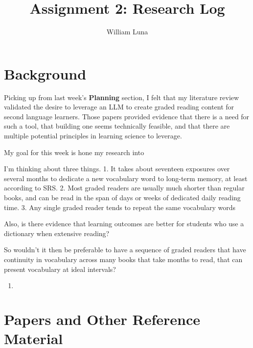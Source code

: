 \documentclass[
	letterpaper, %
]{jdf}
\author{William Luna}
\title{Assignment 2: Research Log}
\begin{document}

\maketitle

\section{Background}
Picking up from last week's \textbf{Planning} section, I felt that my literature review validated the desire to leverage an LLM to create graded reading content for second language learners. Those papers provided evidence that there is a need for such a tool, that building one seems technically feasible, and that there are multiple potential principles in learning science to leverage.

My goal for this week is hone my research into 

I'm thinking about three things.
1. It takes about seventeen exposures over several months to dedicate a new vocabulary word to long-term memory, at least according to SRS.
2. Most graded readers are usually much shorter than regular books, and can be read in the span of days or weeks of dedicated daily reading time.
3. Any single graded reader tends to repeat the same vocabulary words

Also, is there evidence that learning outcomes are better for students who use a dictionary when extensive reading?

So wouldn't it then be preferable to have a sequence of graded readers that have continuity in vocabulary across many books that take months to read, that can present vocabulary at ideal intervals?

\begin{enumerate}
    \item 
\end{enumerate}

\section{Papers and Other Reference Material}
\end{document}

